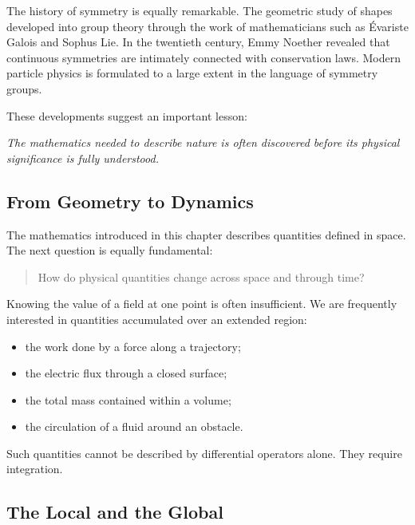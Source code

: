 The history of symmetry is equally remarkable. The geometric study of shapes
developed into group theory through the work of mathematicians such as
Évariste Galois and Sophus Lie. In the twentieth century, Emmy Noether revealed
that continuous symmetries are intimately connected with conservation laws.
Modern particle physics is formulated to a large extent in the language of
symmetry groups.

These developments suggest an important lesson:

\begin{center}
\begin{minipage}{0.82\textwidth}
\centering
\emph{The mathematics needed to describe nature is often discovered before
its physical significance is fully understood.}
\end{minipage}
\end{center}

\subsection{From Geometry to Dynamics}

The mathematics introduced in this chapter describes quantities defined in
space. The next question is equally fundamental:

\begin{quote}
How do physical quantities change across space and through time?
\end{quote}

Knowing the value of a field at one point is often insufficient. We are
frequently interested in quantities accumulated over an extended region:

\begin{itemize}
\item the work done by a force along a trajectory;
\item the electric flux through a closed surface;
\item the total mass contained within a volume;
\item the circulation of a fluid around an obstacle.
\end{itemize}

Such quantities cannot be described by differential operators alone. They
require integration.

\subsection{The Local and the Global}

